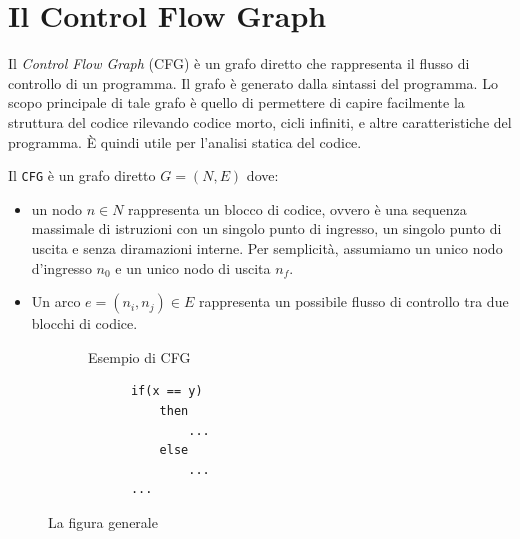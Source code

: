 \section{Il Control Flow Graph}
Il \textit{Control Flow Graph} (CFG) è un grafo diretto che rappresenta il
flusso di controllo di un programma. Il grafo è generato dalla 
sintassi del programma. Lo scopo principale di tale grafo è quello di 
permettere di capire facilmente la struttura del codice rilevando 
codice morto, cicli infiniti, e altre caratteristiche del programma.
È quindi utile per l'analisi statica del codice.

Il \texttt{CFG} è un grafo diretto $G = (N,E)$ dove:
\begin{itemize}
  \item un nodo $n \in N$ rappresenta un blocco di codice, ovvero è una sequenza massimale
  di istruzioni con un singolo punto di ingresso, 
  un singolo punto di uscita e senza diramazioni interne.
  Per semplicità, assumiamo un unico nodo d'ingresso $n_0$ e un unico nodo di uscita $n_f$.
  \item Un arco $e=(n_i,n_j) \in E$ rappresenta un possibile flusso di controllo tra due blocchi di codice.
\end{itemize}
\begin{figure}[H]
  \begin{subfigure}{0.5\textwidth}
    \centering
    \caption{Esempio di CFG}
  \end{subfigure}
  \begin{subfigure}{0.5\textwidth}
    \centering
    \begin{verbatim}
      if(x == y)
          then
              ...
          else
              ...
      ...
      \end{verbatim}
  \end{subfigure}
  \caption{La figura generale}
\end{figure}
